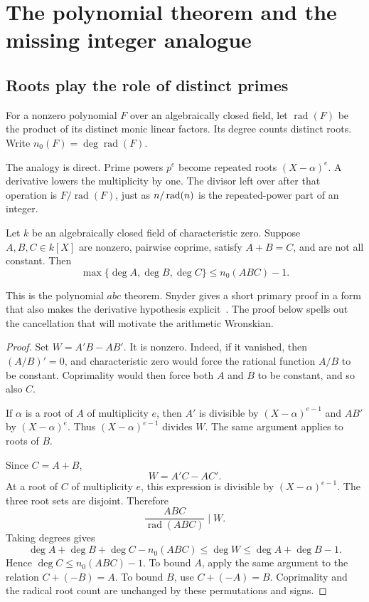 \clearpage
\section{The polynomial theorem and the missing integer analogue}\label{sec:mason}
\subsection{Roots play the role of distinct primes}
For a nonzero polynomial $F$ over an algebraically closed field, let $\operatorname{rad}(F)$ be the product of its distinct monic linear factors. Its degree counts distinct roots. Write $n_0(F)=\deg\operatorname{rad}(F)$.

The analogy is direct. Prime powers $p^e$ become repeated roots $(X-\alpha)^e$. A derivative lowers the multiplicity by one. The divisor left over after that operation is $F/\operatorname{rad}(F)$, just as $n/\operatorname{rad}(n)$ is the repeated-power part of an integer.

\begin{theorem}\label{thm:mason}
Let $k$ be an algebraically closed field of characteristic zero. Suppose $A,B,C\in k[X]$ are nonzero, pairwise coprime, satisfy $A+B=C$, and are not all constant. Then
\[
 \max\{\deg A,\deg B,\deg C\}\le n_0(ABC)-1.
\]
\end{theorem}
This is the polynomial $abc$ theorem. Snyder gives a short primary proof in a form that also makes the derivative hypothesis explicit~\cite{Snyder2000}. The proof below spells out the cancellation that will motivate the arithmetic Wronskian.

\begin{proof}
Set $W=A'B-AB'$. It is nonzero. Indeed, if it vanished, then $(A/B)'=0$, and characteristic zero would force the rational function $A/B$ to be constant. Coprimality would then force both $A$ and $B$ to be constant, and so also $C$.

If $\alpha$ is a root of $A$ of multiplicity $e$, then $A'$ is divisible by $(X-\alpha)^{e-1}$ and $AB'$ by $(X-\alpha)^e$. Thus $(X-\alpha)^{e-1}$ divides $W$. The same argument applies to roots of $B$.

Since $C=A+B$,
\[
 W=A'C-AC'.
\]
At a root of $C$ of multiplicity $e$, this expression is divisible by $(X-\alpha)^{e-1}$. The three root sets are disjoint. Therefore
\[
 \frac{ABC}{\operatorname{rad}(ABC)}\mid W.
\]
Taking degrees gives
\[
 \deg A+\deg B+\deg C-n_0(ABC)\le\deg W\le\deg A+\deg B-1.
\]
Hence $\deg C\le n_0(ABC)-1$. To bound $A$, apply the same argument to the relation $C+(-B)=A$. To bound $B$, use $C+(-A)=B$. Coprimality and the radical root count are unchanged by these permutations and signs.
\end{proof}

